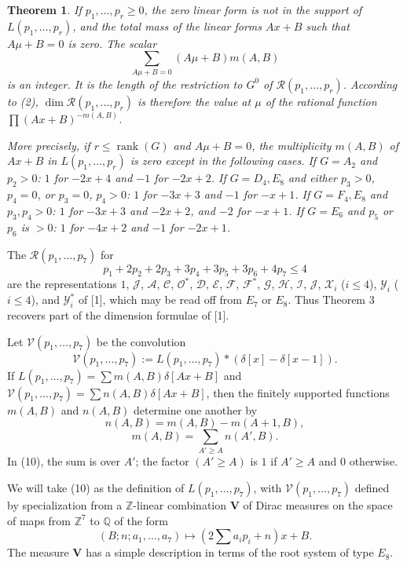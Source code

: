 \documentclass[11pt,a4paper]{article}
\theoremstyle{plain}
\newtheorem{theorem}{Theorem}
\theoremstyle{definition}
\DeclareMathOperator{\rank}{rank}
\begin{document}
\begin{theorem}\label{thm:3}
If $p_1,\ldots,p_r\geq0$, the zero linear form is not in the support of $L(p_1,\ldots,p_r)$, and the total mass of the linear forms $Ax+B$ such that $A\mu+B=0$ is zero. The scalar
\[
\sum_{A\mu+B=0}(A\mu+B)m(A,B)
\]
is an integer. It is the length of the restriction to $G^0$ of $\mathcal R(p_1,\ldots,p_r)$. According to (2), $\dim\mathcal R(p_1,\ldots,p_r)$ is therefore the value at $\mu$ of the rational function $\prod(Ax+B)^{-m(A,B)}$.

More precisely, if $r\leq\rank(G)$ and $A\mu+B=0$, the multiplicity $m(A,B)$ of $Ax+B$ in $L(p_1,\ldots,p_r)$ is zero except in the following cases. If $G=A_2$ and $p_2>0$: $1$ for $-2x+4$ and $-1$ for $-2x+2$. If $G=D_4,E_8$ and either $p_3>0$, $p_4=0$, or $p_3=0$, $p_4>0$: $1$ for $-3x+3$ and $-1$ for $-x+1$. If $G=F_4,E_8$ and $p_3,p_4>0$: $1$ for $-3x+3$ and $-2x+2$, and $-2$ for $-x+1$. If $G=E_6$ and $p_5$ or $p_6$ is $>0$: $1$ for $-4x+2$ and $-1$ for $-2x+1$.
\end{theorem}

The $\mathcal R(p_1,\ldots,p_7)$ for
\[
p_1+2p_2+2p_3+3p_4+3p_5+3p_6+4p_7\leq4
\]
are the representations $1$, $\mathcal J$, $\mathcal A$, $\mathcal C$, $\mathcal O^*$, $\mathcal D$, $\mathcal E$, $\mathcal F$, $\mathcal F^*$, $\mathcal G$, $\mathcal H$, $\mathcal I$, $\mathcal J$, $\mathcal X_i$ ($i\leq4$), $\mathcal Y_i$ ($i\leq4$), and $\mathcal Y_i^*$ of [1], which may be read off from $E_7$ or $E_8$. Thus Theorem 3 recovers part of the dimension formulae of [1].

\smallskip

Let $\mathcal V(p_1,\ldots,p_7)$ be the convolution
\begin{equation}\label{eq:8}
\mathcal V(p_1,\ldots,p_7):=L(p_1,\ldots,p_7)*(\delta[x]-\delta[x-1]).
\end{equation}
If $L(p_1,\ldots,p_7)=\sum m(A,B)\delta[Ax+B]$ and $\mathcal V(p_1,\ldots,p_7)=\sum n(A,B)\delta[Ax+B]$, then the finitely supported functions $m(A,B)$ and $n(A,B)$ determine one another by
\begin{equation}\label{eq:9}
n(A,B)=m(A,B)-m(A+1,B),
\end{equation}
\begin{equation}\label{eq:10}
m(A,B)=\sum_{A'\geq A}n(A',B).
\end{equation}
In (10), the sum is over $A'$; the factor $(A'\geq A)$ is $1$ if $A'\geq A$ and $0$ otherwise.

We will take (10) as the definition of $L(p_1,\ldots,p_7)$, with $\mathcal V(p_1,\ldots,p_7)$ defined by specialization from a $\mathbb Z$-linear combination $\mathbf V$ of Dirac measures on the space of maps from $\mathbb Z^7$ to $\mathbb Q$ of the form
\begin{equation}\label{eq:11}
(B;n;a_1,\ldots,a_7)\longmapsto \left(2\sum a_i p_i+n\right)x+B.
\end{equation}
The measure $\mathbf V$ has a simple description in terms of the root system of type $E_8$.
\end{document}
